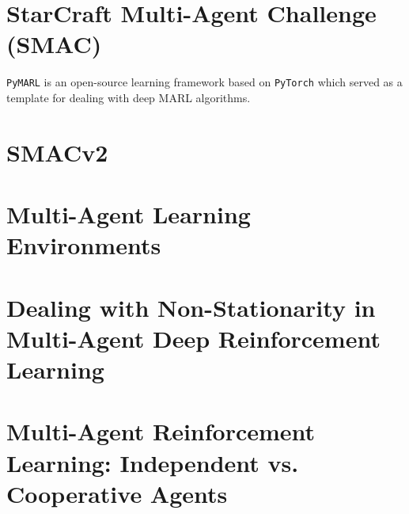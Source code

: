 \documentclass{article}
\begin{document}
\section*{StarCraft Multi-Agent Challenge (SMAC)}        \label{sec.smac}
\texttt{PyMARL} is an open-source learning framework based on
\texttt{PyTorch} which served as a template for dealing with deep MARL algorithms.


\section*{SMACv2}               \label{sec.smacv2}


\section*{Multi-Agent Learning Environments}      \label{sec.male}

\section*{Dealing with Non-Stationarity in Multi-Agent Deep Reinforcement Learning}  \label{sec.non_stat_marl}

\section*{Multi-Agent Reinforcement Learning: Independent vs. Cooperative Agents}   \label{sec.ind_vs_coop}
\end{document}
